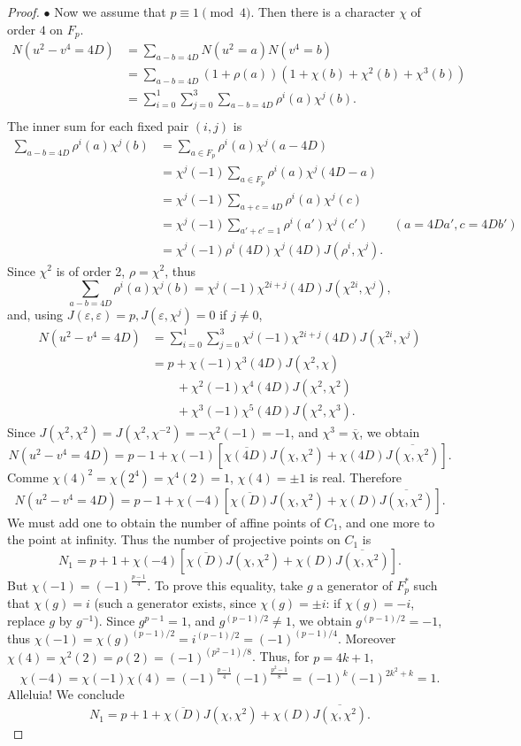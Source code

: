 \documentclass[11pt,a4paper]{article}
\begin{document}
\begin{proof}
$\bullet$ Now we assume that $p\equiv 1 \pmod 4$. Then there is a character $\chi$ of order $4$ on $F_p$.
\begin{align*}
N(u^2 - v^4 = 4D) &= \sum_{a-b = 4D} N(u^2=a)N(v^4=b)\\
&=\sum_{a-b = 4D} (1+\rho(a))(1+\chi(b) + \chi^2(b) + \chi^3(b))\\
&=\sum_{i=0}^1 \sum_{j=0}^3 \sum_{a-b = 4D} \rho^i(a) \chi^j(b).\\
\end{align*}
The inner sum for each fixed pair $(i,j)$ is
\begin{align*}
\sum_{a-b = 4D} \rho^i(a) \chi^j(b) &= \sum_{a \in F_p} \rho^i(a) \chi^j(a - 4D)\\
&=\chi^j(-1)\sum_{a \in F_p} \rho^i(a) \chi^j(4D-a)\\
&= \chi^j(-1)\sum_{a + c = 4D}\rho^i(a) \chi^j(c)\\
&= \chi^j(-1)\sum_{a' + c' = 1}\rho^i(a') \chi^j(c') \qquad (a = 4Da', c = 4Db')\\
&=\chi^j(-1) \rho^i(4D) \chi^j(4D) J(\rho^i, \chi^j).
\end{align*}
Since $\chi^2$ is of order 2, $\rho = \chi^2$, thus
$$\sum_{a-b = 4D} \rho^i(a) \chi^j(b)  = \chi^j(-1)  \chi^{2i+j}(4D) J(\chi^{2i},\chi^j),$$
and, using $J(\varepsilon,\varepsilon) = p , J(\varepsilon,\chi^j) =0$ if $j\ne 0$,
\begin{align*}
N(u^2 - v^4 = 4D)  &= \sum_{i=0}^1 \sum_{j=0}^3 \chi^j(-1)  \chi^{2i+j}(4D) J(\chi^{2i},\chi^j)\\
&=p + \chi(-1) \chi^3(4D) J(\chi^2,\chi) \\
&\phantom{=p\, } + \chi^2(-1) \chi^4(4D) J(\chi^2,\chi^2) \\
&\phantom{=p\, }+ \chi^3(-1) \chi^5(4D) J(\chi^2,\chi^3).
\end{align*}
Since $J(\chi^2,\chi^2) = J(\chi^2,\chi^{-2}) = -\chi^2(-1) = -1$, and $\chi^3 = \overline{\chi}$, we obtain
$$N(u^2 - v^4 = 4D) = p-1 + \chi(-1) [\overline{\chi(4D)} J(\chi,\chi^2) +\chi(4D) \overline{J(\chi,\chi^2)}].$$
Comme $\chi(4)^2 = \chi(2^4) = \chi^4(2) = 1$,  $\chi(4) = \pm 1$ is real. Therefore
$$N(u^2 - v^4 = 4D) = p-1 + \chi(-4) \left [\overline{\chi(D)} J(\chi,\chi^2) +\chi(D) \overline{J(\chi,\chi^2)}\right].$$
We must add one to obtain the number of affine points of $C_1$, and one more to the point at infinity. Thus the number of projective points on $C_1$ is
$$N_1 = p+1 + \chi(-4)[\overline{\chi(D)} J(\chi,\chi^2) +\chi(D) \overline{J(\chi,\chi^2)}].$$
But $\chi(-1) = (-1)^{\frac{p-1}{4}}$. To prove this equality, take $g$ a generator of $F_p^*$ such that $\chi(g) = i$ (such a generator exists, since $\chi(g) = \pm i$: if $\chi(g) = -i$, replace $g$ by $g^{-1}$). Since $g^{p-1} = 1$, and $g^{(p-1)/2} \ne 1$, we obtain $g^{(p-1)/2} = -1$, thus $\chi(-1) = \chi(g)^{(p-1)/2} = i ^{(p-1)/2} = (-1)^{(p-1)/4}$.
Moreover $\chi(4) = \chi^2(2) = \rho(2) = (-1)^{(p^2-1)/8}$. Thus, for $p = 4k +1$,
$$\chi(-4) = \chi(-1) \chi(4) = (-1)^\frac{p-1}{4} (-1)^\frac{p^2 - 1}{8} = (-1)^k (-1)^{2k^2 + k} = 1.$$
Alleluia! We conclude
$$N_1 = p+1 + \overline{\chi(D)} J(\chi,\chi^2) +\chi(D) \overline{J(\chi,\chi^2)}.$$
\end{proof}
\end{document}
